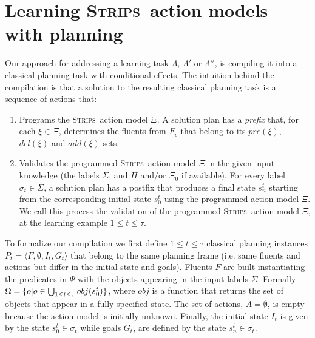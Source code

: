 \documentclass{article}
\newcommand{\tup}[1]{{\langle #1 \rangle}}
\newcommand{\strips}{\textsc{Strips}}     %
\begin{document}
\section{Learning \strips\ action models with planning}
Our approach for addressing a learning task $\Lambda$, $\Lambda'$ or $\Lambda''$, is compiling it into a classical planning task with conditional effects. The intuition behind the compilation is that a solution to the resulting classical planning task is a sequence of actions that:
\begin{enumerate}
\item Programs the \strips\ action model $\Xi$. A solution plan has a {\em prefix} that, for each $\xi\in\Xi$, determines the fluents from $F_v$ that belong to its $pre(\xi)$, $del(\xi)$ and $add(\xi)$ sets.
\item Validates the programmed \strips\ action model $\Xi$ in the given input knowledge (the labels $\Sigma$, and $\Pi$ and/or $\Xi_0$ if available). For every label $\sigma_t\in \Sigma$, a solution plan has a postfix that produces a final state $s_{n}^t$ starting from the corresponding initial state $s_0^t$ using the programmed action model $\Xi$. We call this process the validation of the programmed \strips\ action model $\Xi$, at the learning example {\small $1\leq t\leq \tau$}. %
\end{enumerate}

To formalize our compilation we first define {\small $1\leq t\leq \tau$} classical planning instances $P_t=\tup{F,\emptyset,I_t,G_t}$ that belong to the same planning frame (i.e. same fluents and actions but differ in the initial state and goals). Fluents $F$ are built instantiating the predicates in $\Psi$ with the objects appearing in the input labels $\Sigma$. Formally $\Omega=\{o|o\in \bigcup_{\small 1\leq t\leq \tau} obj(s_0^t)\}$, where $obj$ is a function that returns the set of objects that appear in a fully specified state. The set of actions, $A=\emptyset$, is empty because the action model is initially unknown. Finally, the initial state $I_t$ is given by the state $s_0^t\in \sigma_t$ while goals $G_t$, are defined by the state $s_n^t\in \sigma_t$.
\end{document}
